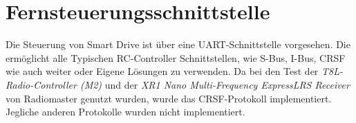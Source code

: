 \chapter{Fernsteuerungsschnittstelle}
Die Steuerung von Smart Drive ist über eine UART-Schnittstelle vorgesehen. Die
ermöglicht alle Typischen RC-Controller Schnittstellen, wie S-Bus, I-Bus, CRSF
wie auch weiter oder Eigene Lösungen zu verwenden. Da bei den Test der
\textit{T8L-Radio-Controller (M2)} \cite{t8l_controller} und der \textit{XR1 Nano Multi-Frequency ExpressLRS
Receiver} \cite{XR1_reciver} von Radiomaster genutzt wurden, wurde das CRSF-Protokoll implementiert. Jegliche anderen Protokolle wurden nicht implementiert. 





